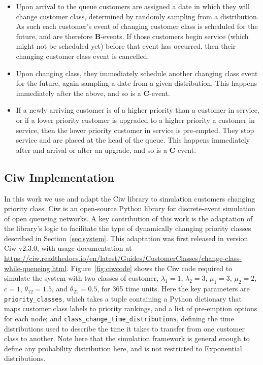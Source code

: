 \documentclass{article}
\begin{document}
\begin{itemize}
  \item Upon arrival to the queue customers are assigned a date in which they
  will change customer class, determined by randomly sampling from a
  distribution. As such each customer's event of changing customer class is
  scheduled for the future, and are therefore \textbf{B}-events. If those
  customers begin service (which might not be scheduled yet) before that event
  has occurred, then their changing customer class event is cancelled.
  \item Upon changing class, they immediately schedule another changing class
  event for the future, again sampling a date from a given distribution. This
  happens immediately after the above, and so is a \textbf{C}-event.
  \item If a newly arriving customer is of a higher priority than a customer in
  service, or if a lower priority customer is upgraded to a higher priority a
  customer in service, then the lower priority customer in service is
  pre-empted. They stop service and are placed at the head of the queue. This
  happens immediately after and arrival or after an upgrade, and so is a
  \textbf{C}-event.
\end{itemize}


\subsection{Ciw Implementation}
In this work we use and adapt the Ciw library \cite{palmer19} to simulation
customers changing priority class. Ciw is an open-source Python library for
discrete-event simulation of open queueing networks. A key contribution of this
work is the adaptation of the library's logic to facilitate the type of
dynamically changing priority classes described in Section~\ref{sec:system}.
This adaptation was first released in version Ciw v2.3.0, with usage
documentation at
\url{https://ciw.readthedocs.io/en/latest/Guides/CustomerClasses/change-class-while-queueing.html}.
Figure~\ref{fig:ciwcode} shows the Ciw code
required to simulate the system with two classes of customer, $\lambda_1 = 1$,
$\lambda_2 = 3$, $\mu_1 = 3$, $\mu_2 = 2$, $c = 1$, $\theta_{12} =1.5$, and
$\theta_{21} = 0.5$, for 365 time units. Here the key parameters are
\texttt{priority_classes}, which takes a tuple containing a Python
dictionary that maps
customer class labels to priority rankings, and a list of pre-emption options
for each node; and \texttt{class_change_time_distributions},
defining the time distributions used to describe the time it takes to transfer
from one customer class to another. Note here that the simulation framework is
general enough to define any probability distribution here, and is not
restricted to Exponential distributions.
\end{document}

